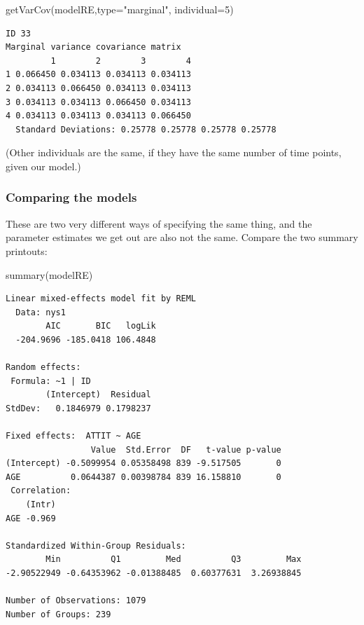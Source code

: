 \documentclass[
  letterpaper,
  DIV=11,
  numbers=noendperiod]{scrreprt}
\newenvironment{Shaded}{\begin{snugshade}}{\end{snugshade}}
\newcommand{\AttributeTok}[1]{\textcolor[rgb]{0.49,0.56,0.16}{#1}}
\newcommand{\DecValTok}[1]{\textcolor[rgb]{0.25,0.63,0.44}{#1}}
\newcommand{\FunctionTok}[1]{\textcolor[rgb]{0.02,0.16,0.49}{#1}}
\newcommand{\NormalTok}[1]{\textcolor[rgb]{0.00,0.44,0.13}{#1}}
\newcommand{\StringTok}[1]{\textcolor[rgb]{0.25,0.44,0.63}{#1}}
\begin{document}
\begin{Shaded}
\begin{Highlighting}[]
\FunctionTok{getVarCov}\NormalTok{(modelRE,}\AttributeTok{type=}\StringTok{"marginal"}\NormalTok{, }\AttributeTok{individual=}\DecValTok{5}\NormalTok{)}
\end{Highlighting}
\end{Shaded}

\begin{verbatim}
ID 33 
Marginal variance covariance matrix
         1        2        3        4
1 0.066450 0.034113 0.034113 0.034113
2 0.034113 0.066450 0.034113 0.034113
3 0.034113 0.034113 0.066450 0.034113
4 0.034113 0.034113 0.034113 0.066450
  Standard Deviations: 0.25778 0.25778 0.25778 0.25778 
\end{verbatim}

(Other individuals are the same, if they have the same number of time
points, given our model.)

\hypertarget{comparing-the-models-1}{%
\subsubsection{Comparing the models}\label{comparing-the-models-1}}

These are two very different ways of specifying the same thing, and the
parameter estimates we get out are also not the same. Compare the two
summary printouts:

\begin{Shaded}
\begin{Highlighting}[]
\FunctionTok{summary}\NormalTok{(modelRE)}
\end{Highlighting}
\end{Shaded}

\begin{verbatim}
Linear mixed-effects model fit by REML
  Data: nys1 
        AIC       BIC   logLik
  -204.9696 -185.0418 106.4848

Random effects:
 Formula: ~1 | ID
        (Intercept)  Residual
StdDev:   0.1846979 0.1798237

Fixed effects:  ATTIT ~ AGE 
                 Value  Std.Error  DF   t-value p-value
(Intercept) -0.5099954 0.05358498 839 -9.517505       0
AGE          0.0644387 0.00398784 839 16.158810       0
 Correlation: 
    (Intr)
AGE -0.969

Standardized Within-Group Residuals:
        Min          Q1         Med          Q3         Max 
-2.90522949 -0.64353962 -0.01388485  0.60377631  3.26938845 

Number of Observations: 1079
Number of Groups: 239 
\end{verbatim}
\end{document}
